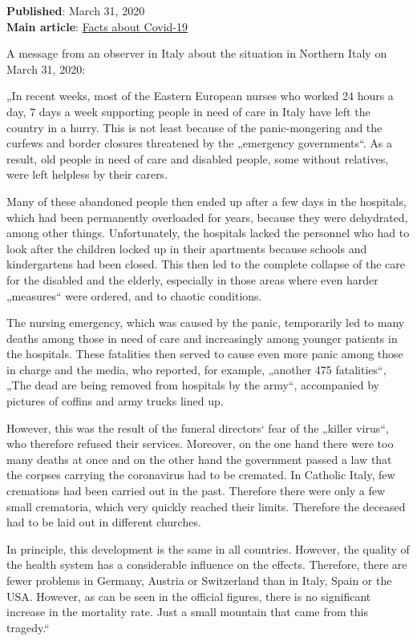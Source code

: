 \textbf{Published}: March 31, 2020\\
\textbf{Main article}:
\href{https://swprs.org/a-swiss-doctor-on-covid-19/}{Facts about
Covid-19}

A message from an observer in Italy about the situation in Northern
Italy on March 31, 2020:

„In recent weeks, most of the Eastern European nurses who worked 24
hours a day, 7 days a week supporting people in need of care in Italy
have left the country in a hurry. This is not least because of the
panic-mongering and the curfews and border closures threatened by the
„emergency governments``. As a result, old people in need of care and
disabled people, some without relatives, were left helpless by their
carers.

Many of these abandoned people then ended up after a few days in the
hospitals, which had been permanently overloaded for years, because they
were dehydrated, among other things. Unfortunately, the hospitals lacked
the personnel who had to look after the children locked up in their
apartments because schools and kindergartens had been closed. This then
led to the complete collapse of the care for the disabled and the
elderly, especially in those areas where even harder „measures`` were
ordered, and to chaotic conditions.

The nursing emergency, which was caused by the panic, temporarily led to
many deaths among those in need of care and increasingly among younger
patients in the hospitals. These fatalities then served to cause even
more panic among those in charge and the media, who reported, for
example, „another 475 fatalities``, „The dead are being removed from
hospitals by the army``, accompanied by pictures of coffins and army
trucks lined up.

However, this was the result of the funeral directors` fear of the
„killer virus``, who therefore refused their services. Moreover, on the
one hand there were too many deaths at once and on the other hand the
government passed a law that the corpses carrying the coronavirus had to
be cremated. In Catholic Italy, few cremations had been carried out in
the past. Therefore there were only a few small crematoria, which very
quickly reached their limits. Therefore the deceased had to be laid out
in different churches.

In principle, this development is the same in all countries. However,
the quality of the health system has a considerable influence on the
effects. Therefore, there are fewer problems in Germany, Austria or
Switzerland than in Italy, Spain or the USA. However, as can be seen in
the official figures, there is no significant increase in the mortality
rate. Just a small mountain that came from this tragedy.``

